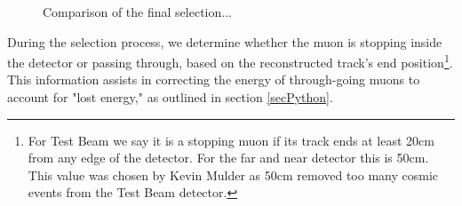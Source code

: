 \documentclass[12pt]{article}
\begin{document}
\begin{figure}[!h]

\caption{Comparison of the final selection...}
\label{figPCHitsListCutsComparison}
\end{figure}

During the selection process, we determine whether the muon is stopping inside the detector or passing through, based on the reconstructed track's end position\footnote{For Test Beam we say it is a stopping muon if its track ends at least 20cm from any edge of the detector. For the far and near detector this is 50cm. This value was chosen by Kevin Mulder \cite{NOVA-doc-39244-v1} as 50cm removed too many cosmic events from the Test Beam detector.}. This information assists in correcting the energy of through-going muons to account for "lost energy," as outlined in section \ref{secPython}.
\end{document}
